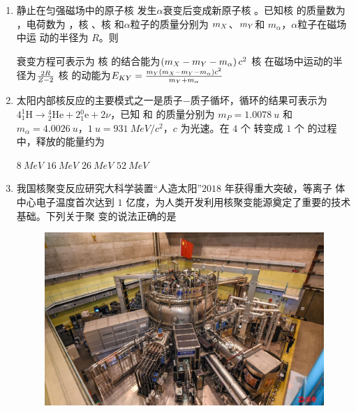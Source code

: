 
\begin{enumerate}
	\item
{}
静止在匀强磁场中的原子核    发生$ \alpha $衰变后变成新原子核    。已知核
   的质量数为   ，电荷数为   ，核   、核    和$ \alpha $粒子的质量分别为 $ m_{\mathnormal{X}} $、$ m_{\mathnormal{Y}} $和 $ m _{\alpha} $，$ \alpha $粒子在磁场中运
动的半径为 $ R $。则  

\fourchoices
{衰变方程可表示为 }
{核  的结合能为$\left(m_{\mathnormal{X}}-m_{\mathnormal{Y}}-m_{\alpha}\right) c^{2}$}
{核  在磁场中运动的半径为$\frac{2 R}{\mathnormal{Z}-2}$}
{核  的动能为$E_{K \mathnormal{Y}}=\frac{m_{Y}\left(m_{\mathnormal{X}}-m_{\mathnormal{Y}}-m_{\alpha}\right) c^{2}}{m_{\mathnormal{Y}}+m_{\alpha}}$}


\item 
{}
太阳内部核反应的主要模式之一是质子$ - $质子循坏，循环的结果可表示为
$4_{1}^{1} \mathrm{H} \rightarrow{ }_{2}^{4} \mathrm{He}+2{ }_{1}^{0} \mathrm{e}+2\nu$，已知  和  的质量分别为 $ m_{P}=1.0078 \ u $ 和 $ m_{ \alpha } =4.0026 \ u $，$ 1 \ u=931 \ MeV/c^{2} $，$ c $
为光速。在 $ 4 $ 个  转变成 $ 1 $ 个  的过程中，释放的能量约为  

\fourchoices
{$ 8 \ MeV $}
{$ 16 \ MeV $}
{$ 26 \ MeV $}
{$ 52 \ MeV $}




\item 
{}
我国核聚变反应研究大科学装置“人造太阳”$ 2018 $ 年获得重大突破，等离子
体中心电子温度首次达到 $ 1 $ 亿度，为人类开发利用核聚变能源奠定了重要的技术基础。下列关于聚
变的说法正确的是  
\begin{figure}[h!]
	\centering
	\includegraphics[width=0.3\linewidth]{picture/screenshot069.png}
\end{figure}




\end{enumerate}
